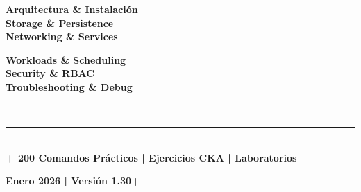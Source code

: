 \documentclass[11pt,a4paper]{article}
\begin{document}
\begin{titlepage}
\begin{center}
\begin{tcolorbox}
        \begin{minipage}{0.45\textwidth}
            \color{white}
            {\small
            \textcolor{k8scyan}{\faServer} \textbf{Arquitectura \& Instalación}\\[0.2cm]
            \textcolor{k8scyan}{\faDatabase} \textbf{Storage \& Persistence}\\[0.2cm]
            \textcolor{k8scyan}{\faNetworkWired} \textbf{Networking \& Services}\\[0.2cm]
            }
        \end{minipage}
        \hfill
        \begin{minipage}{0.45\textwidth}
            \color{white}
            {\small
            \textcolor{k8scyan}{\faCog} \textbf{Workloads \& Scheduling}\\[0.2cm]
            \textcolor{k8scyan}{\faShield} \textbf{Security \& RBAC}\\[0.2cm]
            \textcolor{k8scyan}{\faTools} \textbf{Troubleshooting \& Debug}\\[0.2cm]
            }
        \end{minipage}\\[0.3cm]
        
        \textcolor{k8slightblue}{\rule{0.8\textwidth}{1pt}}\\[0.2cm]
        {\small\color{k8slightblue}\textbf{+ 200 Comandos Prácticos | Ejercicios CKA | Laboratorios}}
    \end{tcolorbox}
    \end{center}
    
    \vspace{1cm}
    
    
    \vfill
    
    {\fontsize{12}{15}\selectfont\color{k8sdarkgray}\textbf{Enero 2026 | Versión 1.30+}}
    
    \restoregeometry
    \nopagecolor
\end{titlepage}
\end{document}
